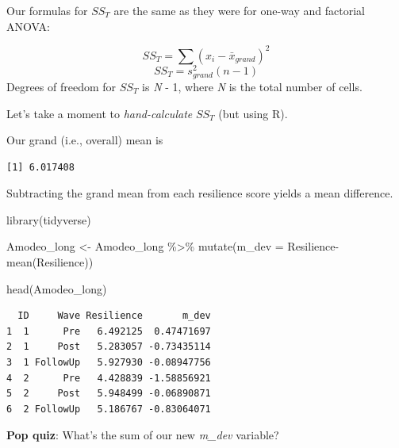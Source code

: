 \documentclass[
  11pt,
]{book}
\newenvironment{Shaded}{\begin{snugshade}}{\end{snugshade}}
\newcommand{\AttributeTok}[1]{\textcolor[rgb]{0.77,0.63,0.00}{#1}}
\newcommand{\FunctionTok}[1]{\textcolor[rgb]{0.00,0.00,0.00}{#1}}
\newcommand{\NormalTok}[1]{#1}
\newcommand{\OtherTok}[1]{\textcolor[rgb]{0.56,0.35,0.01}{#1}}
\newcommand{\SpecialCharTok}[1]{\textcolor[rgb]{0.00,0.00,0.00}{#1}}
\begin{document}
Our formulas for \(SS_{T}\) are the same as they were for one-way and factorial ANOVA:

\[SS_{T}= \sum (x_{i}-\bar{x}_{grand})^{2}\]
\[SS_{T}= s_{grand}^{2}(n-1)\]
Degrees of freedom for \(SS_T\) is \emph{N} - 1, where \emph{N} is the total number of cells.

Let's take a moment to \emph{hand-calculate} \(SS_{T}\) (but using R).

Our grand (i.e., overall) mean is

\begin{Shaded}
\end{Shaded}

\begin{verbatim}
[1] 6.017408
\end{verbatim}

Subtracting the grand mean from each resilience score yields a mean difference.

\begin{Shaded}
\begin{Highlighting}[]
\FunctionTok{library}\NormalTok{(tidyverse)}

\NormalTok{Amodeo\_long }\OtherTok{\textless{}{-}}\NormalTok{ Amodeo\_long }\SpecialCharTok{\%\textgreater{}\%} 
  \FunctionTok{mutate}\NormalTok{(}\AttributeTok{m\_dev =}\NormalTok{ Resilience}\SpecialCharTok{{-}}\FunctionTok{mean}\NormalTok{(Resilience))}

\FunctionTok{head}\NormalTok{(Amodeo\_long)}
\end{Highlighting}
\end{Shaded}

\begin{verbatim}
  ID     Wave Resilience       m_dev
1  1      Pre   6.492125  0.47471697
2  1     Post   5.283057 -0.73435114
3  1 FollowUp   5.927930 -0.08947756
4  2      Pre   4.428839 -1.58856921
5  2     Post   5.948499 -0.06890871
6  2 FollowUp   5.186767 -0.83064071
\end{verbatim}

\textbf{Pop quiz}: What's the sum of our new \emph{m\_dev} variable?

\begin{Shaded}
\end{Shaded}
\end{document}
